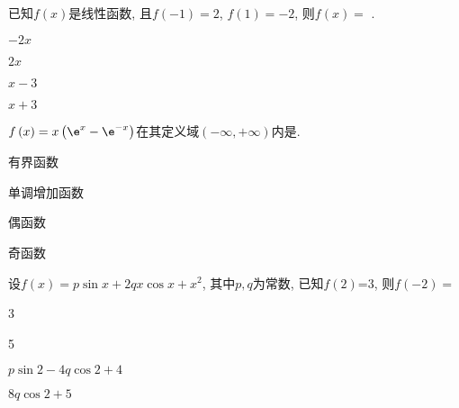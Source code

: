 				\begin{problem}
					已知$f\left( x \right)$是线性函数, 且$f\left( - 1 \right) = 2$, $f\left( 1 \right) = - 2$, 则$f\left( x \right) =$
					.
					
					
					\begin{abcd} \item $- 2x$
						
						\item $2x$
						
						\item $x - 3$
						
						\item $x + 3$
						
				\end{abcd}  \end{problem}
\begin{problem}$f\left( x \right) = x\left( \e^{x} - \e^{- x} \right)$在其定义域$\left( - \infty ,  + \infty \right)$内是.
				
				\begin{abcd} \item 有界函数
					
					\item 单调增加函数
					
					\item 偶函数
					
					\item 奇函数
					
			\end{abcd}  \end{problem}
			
			\begin{problem}
				设$f(x)=p\sin x + 2qx\cos x + x^{2}$, 其中$p,q$为常数, 已知$f\left( 2 \right)\text{=3}$, 则$f( - 2 )=$\pickin{B}
				
				
				\begin{abcd} \item 3
					
					\item 5
					
					\item $p\sin 2 - 4q\cos 2 + 4$
					
					\item $8q\cos 2 + 5$
					
			\end{abcd}  \end{problem}
			
